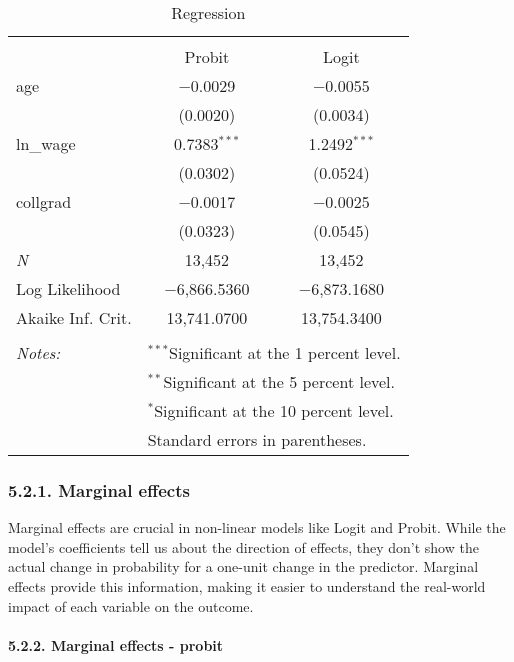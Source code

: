\documentclass[
]{article}
\begin{document}
\begin{table}[!ht] \centering 
  \caption{Regression} 
  \label{regressions} 
\begin{tabular}{@{\extracolsep{5pt}}lcc} 
\\[-1.8ex]\hline 
\hline \\[-1.8ex] 
 &  Probit & Logit \\ 
 age & $-$0.0029 & $-$0.0055 \\ 
  & (0.0020) & (0.0034) \\ 
  ln\_wage & 0.7383$^{***}$ & 1.2492$^{***}$ \\ 
  & (0.0302) & (0.0524) \\ 
  collgrad & $-$0.0017 & $-$0.0025 \\ 
  & (0.0323) & (0.0545) \\ 
 \textit{N} & 13,452 & 13,452 \\ 
Log Likelihood & $-$6,866.5360 & $-$6,873.1680 \\ 
Akaike Inf. Crit. & 13,741.0700 & 13,754.3400 \\ 
\hline 
\hline \\[-1.8ex] 
\textit{Notes:} & \multicolumn{2}{l}{$^{***}$Significant at the 1 percent level.} \\ 
 & \multicolumn{2}{l}{$^{**}$Significant at the 5 percent level.} \\ 
 & \multicolumn{2}{l}{$^{*}$Significant at the 10 percent level.} \\ 
 & \multicolumn{2}{l}{Standard errors in parentheses.} \\ 
\end{tabular} 
\end{table}

\hypertarget{marginal-effects}{%
\subsubsection{5.2.1. Marginal effects}\label{marginal-effects}}

Marginal effects are crucial in non-linear models like Logit and Probit.
While the model's coefficients tell us about the direction of effects,
they don't show the actual change in probability for a one-unit change
in the predictor. Marginal effects provide this information, making it
easier to understand the real-world impact of each variable on the
outcome.

\hypertarget{marginal-effects---probit}{%
\paragraph{5.2.2. Marginal effects -
probit}\label{marginal-effects---probit}}
\end{document}
